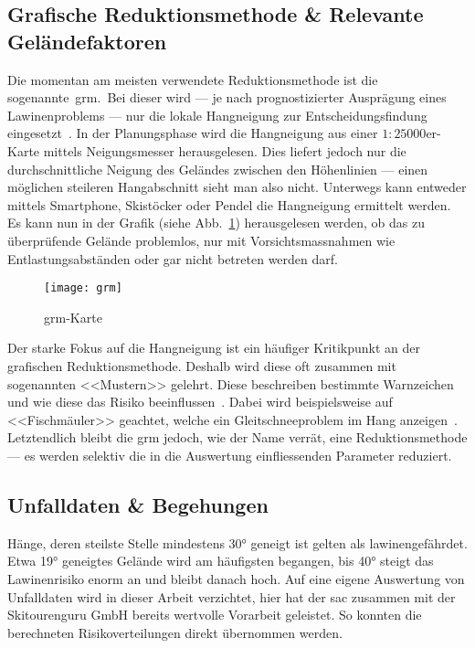 \pagebreak
\subsection{Grafische Reduktionsmethode \& Relevante Geländefaktoren}

Die momentan am meisten verwendete Reduktionsmethode ist die sogenannte\ \acrfull{grm}.\ Bei dieser wird --- je nach prognostizierter Ausprägung eines Lawinenproblems --- nur die lokale Hangneigung zur Entscheidungsfindung eingesetzt~\cite{sacbergspwinter}. In der Planungsphase wird die Hangneigung aus einer $1:25000$er-Karte mittels Neigungsmesser herausgelesen. Dies liefert jedoch nur die durchschnittliche Neigung des Geländes zwischen den Höhenlinien --- einen möglichen steileren Hangabschnitt sieht man also nicht.
Unterwegs kann entweder mittels Smartphone, Skistöcker oder Pendel die Hangneigung ermittelt werden. Es kann nun in der Grafik (siehe Abb.\ \ref{fig:grm}) herausgelesen werden, ob das zu überprüfende Gelände problemlos, nur mit Vorsichtsmassnahmen wie Entlastungsabständen oder gar nicht betreten werden darf.

\begin{figure}[H]
  \centering
  \texttt{[image: grm]}
  \caption{\gls{grm}-Karte~\cite{achtunglawine}}\label{fig:grm}
\end{figure}

Der starke Fokus auf die Hangneigung ist ein häufiger Kritikpunkt an der grafischen Reduktionsmethode. Deshalb wird diese oft zusammen mit sogenannten <<Mustern>> gelehrt. Diese beschreiben bestimmte Warnzeichen und wie diese das Risiko beeinflussen~\cite{achtunglawine}. Dabei wird beispielsweise auf <<Fischmäuler>> geachtet, welche ein Gleitschneeproblem im Hang anzeigen~\cite{harveyrhynerschweizerlawinenkunde}. Letztendlich bleibt die \gls{grm} jedoch, wie der Name verrät, eine Reduktionsmethode --- es werden selektiv die in die Auswertung einfliessenden Parameter reduziert.

\subsection{Unfalldaten \& Begehungen}

Hänge, deren steilste Stelle mindestens 30° geneigt ist gelten als lawinengefährdet. Etwa 19° geneigtes Gelände wird am häufigsten begangen, bis 40° steigt das Lawinenrisiko enorm an und bleibt danach hoch. Auf eine eigene Auswertung von Unfalldaten wird in dieser Arbeit verzichtet, hier hat der \acrfull{sac} zusammen mit der Skitourenguru GmbH bereits wertvolle Vorarbeit geleistet. So konnten die berechneten Risikoverteilungen direkt übernommen werden.~\cite{sacbergspwinterp99} 


